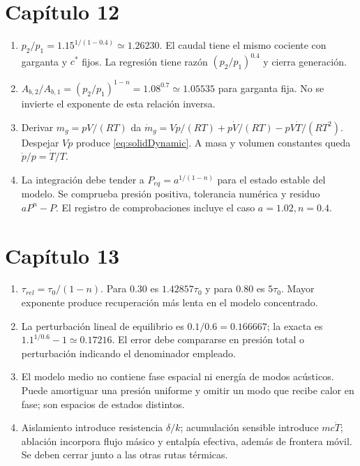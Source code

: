 \section*{Capítulo 12}
\begin{enumerate}
\item $p_2/p_1=1.15^{1/(1-0.4)}\simeq1.26230$. El caudal tiene el mismo cociente con garganta y $c^*$ fijos. La regresión tiene razón $(p_2/p_1)^{0.4}$ y cierra generación.
\item $A_{b,2}/A_{b,1}=(p_2/p_1)^{1-n}=1.08^{0.7}\simeq1.05535$ para garganta fija. No se invierte el exponente de esta relación inversa.
\item Derivar $m_g=pV/(RT)$ da $\dot m_g=V\dot p/(RT)+p\dot V/(RT)-pV\dot T/(RT^2)$. Despejar $V\dot p$ produce \eqref{eq:solidDynamic}. A masa y volumen constantes queda $\dot p/p=\dot T/T$.
\item La integración debe tender a $P_{eq}=a^{1/(1-n)}$ para el estado estable del modelo. Se comprueba presión positiva, tolerancia numérica y residuo $aP^n-P$. El registro de comprobaciones incluye el caso $a=1.02,n=0.4$.
\end{enumerate}
\section*{Capítulo 13}
\begin{enumerate}
\item $\tau_{rel}=\tau_0/(1-n)$. Para 0.30 es $1.42857\tau_0$ y para 0.80 es $5\tau_0$. Mayor exponente produce recuperación más lenta en el modelo concentrado.
\item La perturbación lineal de equilibrio es $0.1/0.6=0.166667$; la exacta es $1.1^{1/0.6}-1\simeq0.17216$. El error debe compararse en presión total o perturbación indicando el denominador empleado.
\item El modelo medio no contiene fase espacial ni energía de modos acústicos. Puede amortiguar una presión uniforme y omitir un modo que recibe calor en fase; son espacios de estados distintos.
\item Aislamiento introduce resistencia $\delta/k$; acumulación sensible introduce $mc\dot T$; ablación incorpora flujo másico y entalpía efectiva, además de frontera móvil. Se deben cerrar junto a las otras rutas térmicas.
\end{enumerate}
